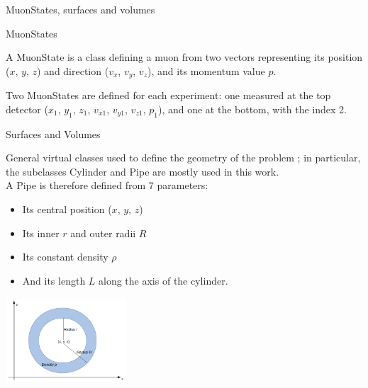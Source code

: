 \documentclass[8 pt]{beamer}
\begin{document}
\begin{frame}{MuonStates, surfaces and volumes}
\justifying
\begin{exampleblock}{} MuonStates \end{exampleblock}
A MuonState is a class defining a muon from two vectors representing its position ($x$, $y$, $z$) and direction ($v_x$, $v_y$, $v_z$), and its momentum value $p$. \\ \vspace{10pt}

Two MuonStates are defined for each experiment: one measured at the top detector ($x_1$, $y_1$, $z_1$, $v_{x1}$, $v_{y1}$, $v_{z1}$, $p_1$), and one at the bottom, with the index 2. \vfill

\begin{minipage}[c]{.65\textwidth}
\begin{exampleblock}{} Surfaces and Volumes \end{exampleblock}
\justifying
General virtual classes used to define the geometry of the problem ; in particular, the subclasses Cylinder and Pipe are mostly used in this work. 
\\ \vspace{5pt}
A Pipe is therefore defined from 7 parameters: 
\begin{itemize}
\item Its central position ($x$, $y$, $z$)
\item Its inner $r$ and outer radii $R$
\item Its constant density $\rho$
\item And its length $L$ along the axis of the cylinder.
\end{itemize}
\end{minipage}
\begin{minipage}[c]{.33\textwidth}
\includegraphics[width=4.5cm, height=3.2cm]{figs/cylinder.png}
\end{minipage} \vfill

\end{frame}
\end{document}
